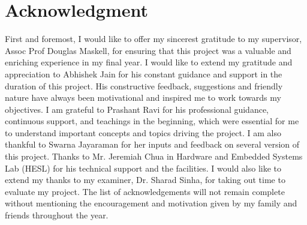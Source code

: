 \chapter*{Acknowledgment} 
\label{ch0ii_Acknowledgement}


First and foremost, I would like to offer my sincerest gratitude to my supervisor, Assoc Prof Douglas Maskell, for ensuring that this project was a valuable and enriching experience in my final year. \newline\newline
I would like to extend my gratitude and appreciation to Abhishek Jain for his constant guidance and support in the duration of this project. His constructive feedback, suggestions and friendly nature have always been motivational and inspired me to work towards my objectives. \newline\newline
I am grateful to Prashant Ravi for his professional guidance, continuous support, and teachings in the beginning, which were essential for me to understand important concepts and topics driving the project. I am also thankful to Swarna Jayaraman for her inputs and feedback on several version of this project. \newline \newline Thanks to Mr. Jeremiah Chua in Hardware and Embedded Systems Lab (HESL) for his technical support and the facilities.\newline\newline
I would also like to extend my thanks to my examiner, Dr. Sharad Sinha, for taking out time to evaluate my project. \newline\newline
The list of acknowledgements will not remain complete without mentioning the encouragement and motivation given by my family and friends throughout the year. \newline\newline